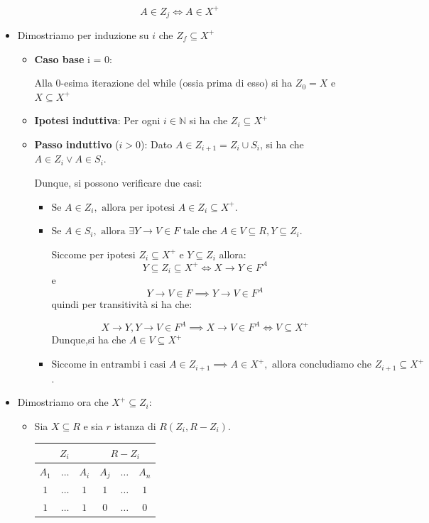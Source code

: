 \documentclass{article}
\begin{document}
\[A \in Z_{j} \Leftrightarrow A \in X^{+} \]
\begin{itemize}
  \item Dimostriamo per induzione su $i$ che $Z_{f} \subseteq X^{+}$
  \begin{itemize}
    \item \textbf{Caso base} i = 0:\par 
    Alla $0$-esima iterazione del while (ossia prima di esso) si ha $Z_{0} = X$ e $X \subseteq X^{+}$

    \item \textbf{Ipotesi induttiva}: Per ogni $i \in\mathbb{N}$ si ha che $Z_i \subseteq X^+$

    \item \textbf{Passo induttivo} ($i > 0$):
    Dato $A \in Z_{i+1} = Z_i \cup S_i$, si ha che $A \in Z_i \lor A \in S_i$. \par 
    Dunque, si possono verificare due casi:
    \begin{itemize}
      \item $\text{Se } A \in Z_i, \text{ allora per ipotesi } A \in Z_i \subseteq X^+.$
      \item $\text{Se } A \in S_i, \text{ allora } \exists Y \rightarrow V \in F \text{ tale che } A \in V \subseteq R, Y \subseteq Z_i.$\par
      Siccome per ipotesi  $Z_i \subseteq X^+ \text{ e } Y \subseteq Z_i$ allora: 
      \[Y \subseteq Z_i \subseteq X^+ \iff X \rightarrow Y \in F^A\] e 
      \[Y \rightarrow V \in F \implies Y \rightarrow V \in F^A\] 
      quindi per transitività si ha che:

      \[X \rightarrow Y, Y \rightarrow V \in F^A \implies X \rightarrow V \in F^A \iff V \subseteq X^+\]
      Dunque,si ha che $A \in V \subseteq X^+$
      \item $\text{Siccome in entrambi i casi } A \in Z_{i+1} \implies A \in X^+, \text{ allora concludiamo che } Z_{i+1} \subseteq X^+$.

    \end{itemize}
    
  \end{itemize}
  
  \item Dimostriamo ora che $X^{+} \subseteq Z_{i}$:\par
  \begin{itemize}
    \item Sia $X \subseteq R$ e sia $r$ istanza di $R(Z_{i}, R-Z_{i})$. 
    \begin{table}[ht]
      \centering
      \begin{tabular}{|c|c|c|c|c|c|}
      \hline
      \multicolumn{3}{|c|}{$Z_{i}$} & \multicolumn{3}{c|}{$R - Z_{i}$} \\
      \hline
      $A_1$ & $\dots$ & $A_{i}$ & $A_{j}$ & $\dots$  & $A_{n}$ \\
      \hline
      $1$ & $\dots$ & $1$ & $1$ & $\dots$  & $1$ \\
      \hline
      $1$ & $\dots$ & $1$ & $0$ & $\dots$  & $0$ \\
      \hline
      \end{tabular}
  \end{table}


\end{itemize}
\end{itemize}
\end{document}
